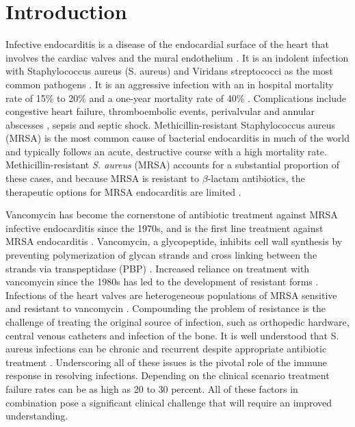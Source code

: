 \documentclass[12pt, draftcls, onecolumn]{IEEEtran}
\begin{document}
\section{Introduction}
Infective endocarditis is a disease of the endocardial surface of the heart that involves the cardiac valves and the mural
endothelium \cite{Li2024}. It is an indolent infection with Staphylococcus aureus (S. aureus) and Viridans streptococci as the most
common pathogens \cite{HammondHaley2023}. It is an aggressive infection with an in hospital mortality rate of 15\% to 20\% and
a one-year mortality rate of 40\% \cite{Taduru2023}. Complications include congestive heart failure, thromboembolic events,
perivalvular and annular abscesses \cite{murdoch2009infective}, sepsis and septic shock.
Methicillin-resistant Staphylococcus aureus (MRSA) is the most common cause of bacterial
endocarditis in much of the world and typically follows an acute, destructive course with a high mortality rate.
Methicillin-resistant \textit{S. aureus} (MRSA) accounts for
a substantial proportion of these cases, and because MRSA is
resistant to $\beta$-lactam antibiotics, the therapeutic options for MRSA
endocarditis are limited \cite{HammondHaley2023}.    



Vancomycin has become the cornerstone of antibiotic treatment against MRSA infective endocarditis since the 1970s,
and is the first line treatment against MRSA endocarditis \citep{Minter2023}. Vancomycin, a glycopeptide,
inhibits cell wall synthesis by preventing polymerization of glycan strands and cross linking between the strands via
transpeptidase (PBP) \citep{murray_glycopeptides_2019}. Increased reliance on treatment with vancomycin since the 1980s has led to the development
of resistant forms \citep{mcguinness2017vancomycin}. Infections of the heart valves are heterogeneous populations of MRSA sensitive and
resistant to vancomycin \citep{}{}.  Compounding the problem of resistance is the challenge of treating the original source of infection,
such as orthopedic hardware, central venous catheters and infection of the bone. It is well understood that S. aureus infections 
can be chronic and recurrent despite appropriate antibiotic treatment \citep{Kahl2016SCV}. Underscoring all of these issues is the pivotal
role of the immune response in resolving infections. Depending on the clinical scenario treatment failure rates can be as high as 20 to 30 percent.  All of these factors in combination pose a significant clinical challenge that will require an improved understanding.  
\end{document}
